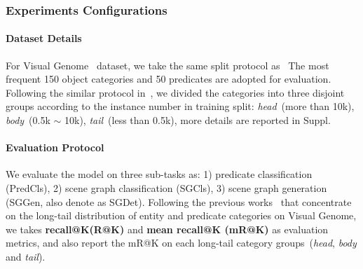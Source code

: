 \subsubsection{Experiments Configurations}

\paragraph{Dataset Details}  
For Visual Genome~\cite{krishna2017visual} dataset, we take the same split protocol as~\cite{xu_scene_2017,zellers_neural_2017}
The most frequent 150 object categories and 50 predicates are adopted for evaluation. Following the similar protocol in~\cite{liu_largescale_2019}, we divided the categories into three disjoint groups according to the instance number in training split: \textit{head}~(more than 10k), \textit{body}~(0.5k $\sim $ 10k), \textit{tail}~(less than 0.5k), more details are reported in Suppl.

\vspace{-0.4cm}

\paragraph{Evaluation Protocol}
We evaluate the model on three sub-tasks as\cite{xu_scene_2017,zellers_neural_2017}:
1) predicate classification (PredCls), 
2) scene graph classification (SGCls),
3) scene graph generation (SGGen, also denote as SGDet).
Following the previous works~\cite{chen_knowledge-embedded_2019, tang_learning_2018,tang_unbiased_2020,lin_gps-net_2020} that concentrate on the long-tail distribution of entity and predicate categories on Visual Genome,
we takes \textbf{recall@K(R@K)} and \textbf{mean recall@K (mR@K)} as evaluation metrics, and also report the mR@K on each long-tail category groups~(\textit{head}, \textit{body} and \textit{tail}).

\vspace{-0.4cm}

